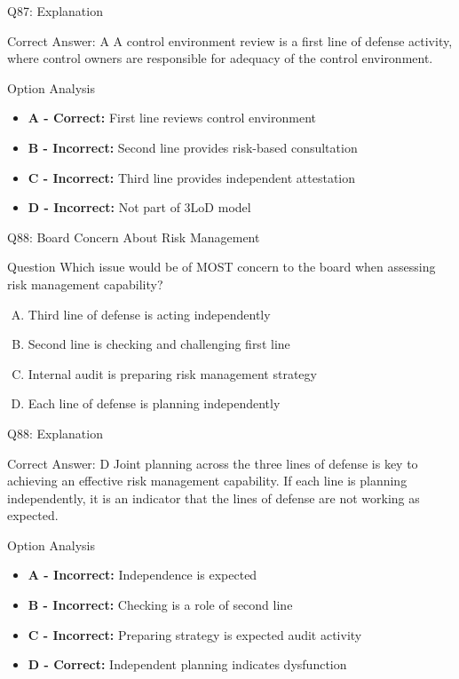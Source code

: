 \documentclass{beamer}
\begin{document}
	\begin{frame}{Q87: Explanation}
		\begin{block}{Correct Answer: A}
			A control environment review is a first line of defense activity, where control owners are responsible for adequacy of the control environment.
		\end{block}
		\begin{block}{Option Analysis}
			\begin{itemize}
				\item \textbf{A - Correct:} First line reviews control environment
				\item \textbf{B - Incorrect:} Second line provides risk-based consultation
				\item \textbf{C - Incorrect:} Third line provides independent attestation
				\item \textbf{D - Incorrect:} Not part of 3LoD model
			\end{itemize}
		\end{block}
	\end{frame}
	
	\begin{frame}{Q88: Board Concern About Risk Management}
		\begin{block}{Question}
			Which issue would be of MOST concern to the board when assessing risk management capability?
		\end{block}
		\begin{enumerate}[(A)]
			\item Third line of defense is acting independently
			\item Second line is checking and challenging first line
			\item Internal audit is preparing risk management strategy
			\item Each line of defense is planning independently
		\end{enumerate}
	\end{frame}
	
	\begin{frame}{Q88: Explanation}
		\begin{block}{Correct Answer: D}
			Joint planning across the three lines of defense is key to achieving an effective risk management capability. If each line is planning independently, it is an indicator that the lines of defense are not working as expected.
		\end{block}
		\begin{block}{Option Analysis}
			\begin{itemize}
				\item \textbf{A - Incorrect:} Independence is expected
				\item \textbf{B - Incorrect:} Checking is a role of second line
				\item \textbf{C - Incorrect:} Preparing strategy is expected audit activity
				\item \textbf{D - Correct:} Independent planning indicates dysfunction
			\end{itemize}
		\end{block}
	\end{frame}
	
\end{document}
